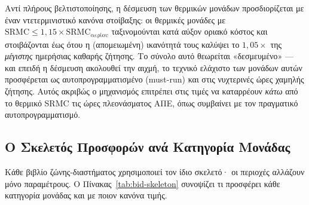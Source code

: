 Αντί πλήρους βελτιστοποίησης, η δέσμευση των θερμικών μονάδων προσδιορίζεται με έναν ντετερμινιστικό κανόνα στοίβαξης: οι θερμικές μονάδες με $\text{SRMC} \le 1{,}15 \times \text{SRMC}_{\text{αερίου}}$ ταξινομούνται κατά αύξον οριακό κόστος και στοιβάζονται έως ότου η (απομειωμένη) ικανότητά τους καλύψει το $1{,}05 \times$ της \emph{μέγιστης} ημερήσιας καθαρής ζήτησης. Το σύνολο αυτό θεωρείται «δεσμευμένο» --- και επειδή η δέσμευση ακολουθεί την αιχμή, το τεχνικό ελάχιστο των μονάδων αυτών προσφέρεται ως αυτοπρογραμματισμένο (must-run) και στις νυχτερινές ώρες χαμηλής ζήτησης. Αυτός ακριβώς ο μηχανισμός επιτρέπει στις τιμές να καταρρέουν \emph{κάτω} από το θερμικό SRMC τις ώρες πλεονάσματος ΑΠΕ, όπως συμβαίνει με τον πραγματικό αυτοπρογραμματισμό.

\subsection{Ο Σκελετός Προσφορών ανά Κατηγορία Μονάδας}
\label{subsec:bid-skeleton}

Κάθε βιβλίο ζώνης-διαστήματος χρησιμοποιεί τον ίδιο σκελετό· οι περιοχές αλλάζουν μόνο παραμέτρους. Ο Πίνακας~\ref{tab:bid-skeleton} συνοψίζει τι προσφέρει κάθε κατηγορία μονάδας και με ποιον κανόνα τιμής.

